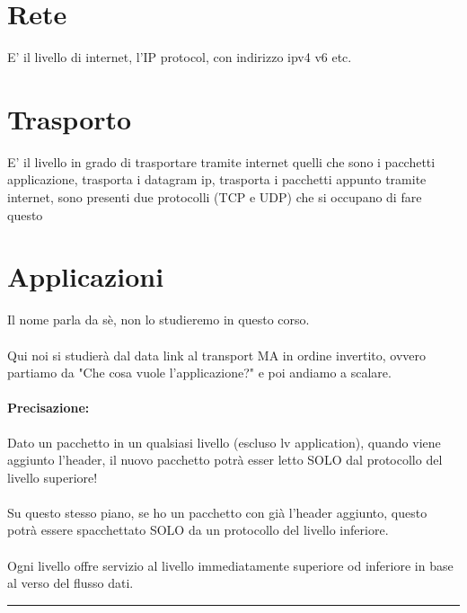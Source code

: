 \documentclass[12pt, a4paper, openany, twoside]{book}
\begin{document}
\section{Rete} E' il livello di internet, l'IP protocol, con indirizzo ipv4 v6 etc.
\section{Trasporto}
E' il livello in grado di trasportare tramite internet quelli che sono i pacchetti
applicazione, trasporta i datagram ip, trasporta i pacchetti appunto tramite 
internet, sono presenti due protocolli (TCP e UDP) che si occupano di fare questo
\section{Applicazioni} Il nome parla da sè, non lo studieremo in questo corso.
\\ \\
Qui noi si studierà dal data link al transport MA in ordine invertito, ovvero
partiamo da "Che cosa vuole l'applicazione?" e poi andiamo a scalare.
\paragraph{Precisazione:}
Dato un pacchetto in un qualsiasi livello (escluso lv application), 
quando viene aggiunto l'header, il nuovo pacchetto potrà esser letto SOLO dal
protocollo del livello superiore! \\ \\
Su questo stesso piano, se ho un pacchetto con già l'header aggiunto, questo
potrà essere spacchettato SOLO da un protocollo del livello inferiore.\\ \\
Ogni livello offre servizio al livello immediatamente superiore od inferiore in
base al verso del flusso dati.
\\
{\color{black} \rule{\linewidth}{0.2mm} }
\end{document}

